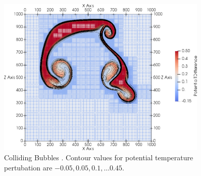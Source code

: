 \documentclass[runningheads]{llncs}
\begin{document}
\begin{figure}[tb]
  \centering
  \includegraphics[width=0.90\textwidth]{paper_two_bubbles}
  \caption{\label{fig:two-bubbles-ader}Colliding Bubbles \aderdg{}. Contour values for potential temperature pertubation are $-0.05, 0.05, 0.1, \ldots 0.45$.}
\end{figure}
\end{document}
